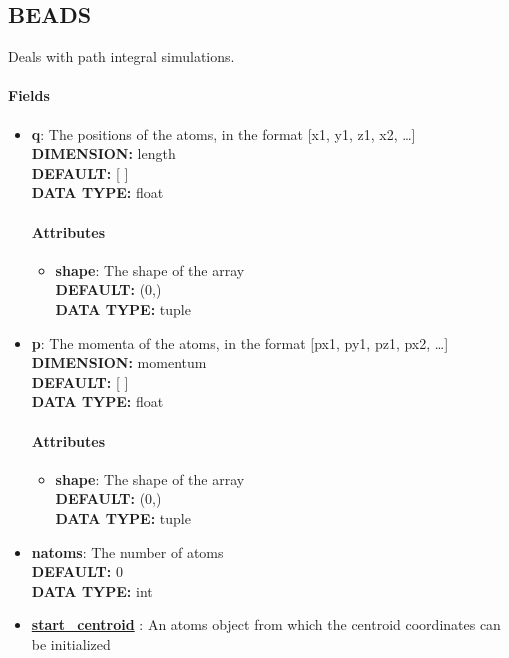 \subsection{BEADS}
\label{BEADS}
Deals with path integral simulations.
\paragraph{Fields}
 \begin{itemize}
\item {\bf q}:
 The positions of the atoms, in the format [x1, y1, z1, x2, \ldots  ]
{\\ \bf DIMENSION: }length
{\\ \bf DEFAULT: }[ ]
{\\ \bf DATA TYPE: }float
\paragraph{Attributes}
 \begin{itemize}
\item {\bf shape}:
 The shape of the array
{\\ \bf DEFAULT: }(0,)
{\\ \bf DATA TYPE: }tuple
\end{itemize}
 
\item {\bf p}:
 The momenta of the atoms, in the format [px1, py1, pz1, px2, \ldots  ]
{\\ \bf DIMENSION: }momentum
{\\ \bf DEFAULT: }[ ]
{\\ \bf DATA TYPE: }float
\paragraph{Attributes}
 \begin{itemize}
\item {\bf shape}:
 The shape of the array
{\\ \bf DEFAULT: }(0,)
{\\ \bf DATA TYPE: }tuple
\end{itemize}
 
\item {\bf natoms}:
 The number of atoms
{\\ \bf DEFAULT: }0
{\\ \bf DATA TYPE: }int
\item {\bf \hyperref[ATOMS]{start\_centroid} }:
 An atoms object from which the centroid coordinates can be initialized

\end{itemize}
